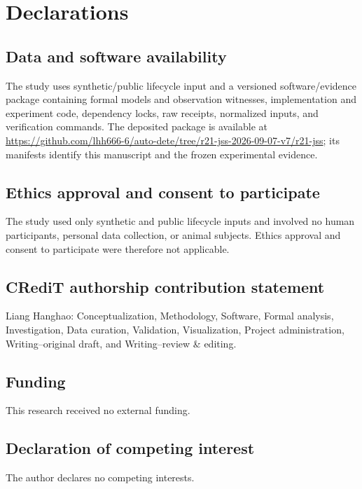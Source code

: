 \section*{Declarations}

\subsection*{Data and software availability}

The study uses synthetic/public lifecycle input and a versioned software/evidence package containing formal models and observation witnesses, implementation and experiment code, dependency locks, raw receipts, normalized inputs, and verification commands. The deposited package is available at \url{https://github.com/lhh666-6/auto-dete/tree/r21-jss-2026-09-07-v7/r21-jss}; its manifests identify this manuscript and the frozen experimental evidence.

\subsection*{Ethics approval and consent to participate}

The study used only synthetic and public lifecycle inputs and involved no human participants, personal data collection, or animal subjects. Ethics approval and consent to participate were therefore not applicable.

\subsection*{CRediT authorship contribution statement}

Liang Hanghao: Conceptualization, Methodology, Software, Formal analysis, Investigation, Data curation, Validation, Visualization, Project administration, Writing--original draft, and Writing--review \& editing.

\subsection*{Funding}

This research received no external funding.

\subsection*{Declaration of competing interest}

The author declares no competing interests.

